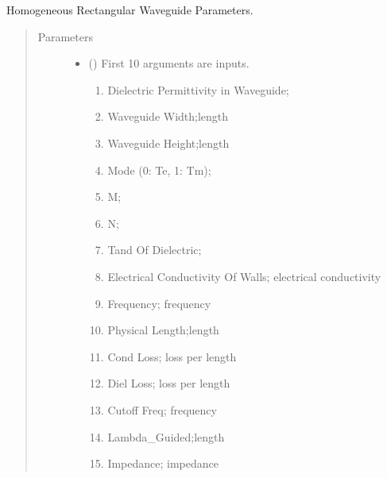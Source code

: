\documentclass[letterpaper,10pt,english]{sphinxmanual}
\begin{document}
\begin{fulllineitems}
\label{\detokenize{components:components.HomogeneousRectWaveguideParameters_TE}}
Homogeneous Rectangular Waveguide Parameters.
\begin{quote}\begin{description}
\item[{Parameters}] \leavevmode\begin{itemize}
\item {} 
 () \textendash{} 
First 10 arguments are inputs.
\begin{enumerate}
%
\item {} 
Dielectric Permittivity in Waveguide;

\item {} 
Waveguide Width;length

\item {} 
Waveguide Height;length

\item {} 
Mode (0: Te, 1: Tm);

\item {} 
M;

\item {} 
N;

\item {} 
Tand Of Dielectric;

\item {} 
Electrical Conductivity Of Walls; electrical conductivity

\item {} 
Frequency; frequency

\item {} 
Physical Length;length

\item {} 
Cond Loss; loss per length

\item {} 
Diel Loss; loss per length

\item {} 
Cutoff Freq; frequency

\item {} 
Lambda\_Guided;length

\item {} 
Impedance; impedance


\end{enumerate}
\end{itemize}
\end{description}
\end{quote}
\end{fulllineitems}
\end{document}

